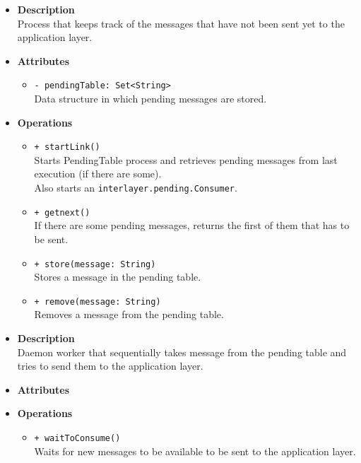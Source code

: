 \FloatBarrier
\begin{itemize}
  \item \textbf{Description} \\
    Process that keeps track of the messages that have not been sent yet to
    the application layer.
  \item \textbf{Attributes}
    \begin{itemize}
      \item \texttt{- pendingTable: Set<String>} \\
    Data structure in which pending messages are stored.
    \end{itemize}
  \item \textbf{Operations}
  \begin{itemize}
    \item \texttt{+ startLink()} \\
    Starts PendingTable process and retrieves pending messages from last
    execution (if there are some). \\
    Also starts an \texttt{interlayer.pending.Consumer}.
    \item \texttt{+ getnext()} \\
    If there are some pending messages, returns the first of them that has to
    be sent.
    \item \texttt{+ store(message: String)} \\
    Stores a message in the pending table.
    \item \texttt{+ remove(message: String)} \\
    Removes a message from the pending table.
  \end{itemize}
\end{itemize}

\FloatBarrier
\begin{itemize}
  \item \textbf{Description} \\
    Daemon worker that sequentially takes message from the pending table and
    tries to send them to the application layer.
  \item \textbf{Attributes}
  \item \textbf{Operations}
  \begin{itemize}
    \item \texttt{+ waitToConsume()} \\
    Waits for new messages to be available to be sent to the application layer.
  \end{itemize}
\end{itemize}
